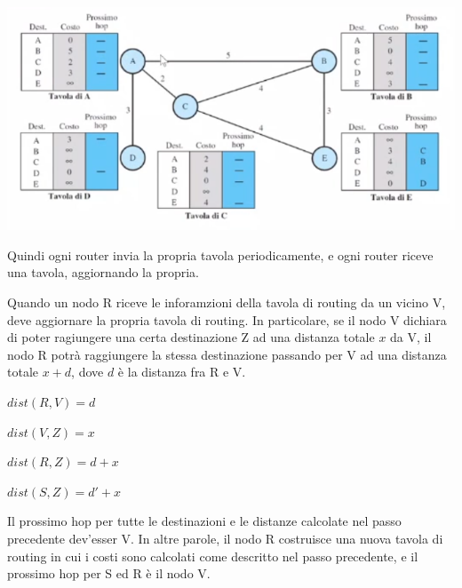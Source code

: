             \begin{center}
                \includegraphics[scale=0.5]{images/Vector2.png}
            \end{center}
            
            Quindi ogni router invia la propria tavola periodicamente, e ogni router riceve una tavola, aggiornando la propria.
            
            Quando un nodo R riceve le inforamzioni della tavola di routing da un vicino V, deve aggiornare la propria tavola di routing. In particolare, se il nodo V dichiara di poter ragiungere una certa destinazione Z ad una distanza totale $x$ da V, il nodo R potrà raggiungere la stessa destinazione passando per V ad una distanza totale $x+d$, dove $d$ è la distanza fra R e V.
            
            \begin{center}
                $dist(R, V) = d$
                
                \vspace{2mm}
                
                $dist(V, Z) = x$
                
                \vspace{2mm}
                
                $dist(R, Z) = d+x$
                
                \vspace{2mm}
                
                $dist(S, Z) = d' + x$
            \end{center}
            
            Il prossimo hop per tutte le destinazioni e le distanze calcolate nel passo precedente dev'esser V. In altre parole, il nodo R costruisce una nuova tavola di routing in cui i costi sono calcolati come descritto nel passo precedente, e il prossimo hop per S ed R è il nodo V.
            
